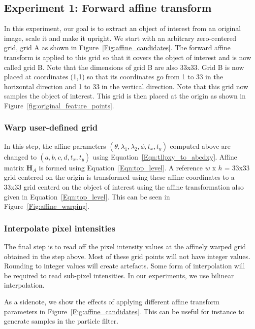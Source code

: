 \subsection{Experiment 1: Forward affine transform}
In this experiment, our goal is to extract an object of interest from an original image, scale it and make it upright.  We start with an arbitrary zero-centered grid, grid A as shown in Figure~\ref{Fig:affine_candidates}.  The forward affine transform is applied to this grid so that it covers the object of interest and is now called grid B.  Note that the dimensions of grid B are also 33x33.  Grid B is now placed at coordinates (1,1) so that its coordinates go from 1 to 33 in the horizontal direction and 1 to 33 in the vertical direction.  Note that this grid now samples the object of interest.  This grid is then placed at the origin as shown in Figure~\ref{fig:original_feature_points}.  

\subsubsection{Warp user-defined grid}
In this step, the affine parameters $(\theta, \lambda_1, \lambda_2, \phi, t_x, t_y)$ computed above are changed to $(a, b, c, d, t_x, t_y)$ using Equation~\ref{Eqn:tllpxy_to_abcdxy}.  Affine matrix $\mathbf{H}_A$ is formed using Equation~\ref{Eqn:top_level}.  A reference $w$ x $h$ = 33x33 grid centered on the origin is transformed using these affine coordinates to a 33x33 grid centerd on the object of interest using the affine transformation also given in Equation~\ref{Eqn:top_level}.  This can be seen in Figure~\ref{Fig:affine_warping}.

\subsubsection{Interpolate pixel intensities}
The final step is to read off the pixel intensity values at the affinely warped grid obtained in the step above.  Most of these grid points will not have integer values.  Rounding to integer values will create artefacts.  Some form of interpolation will be required to read sub-pixel intensities.  In our experiments, we use bilinear interpolation. 

As a sidenote, we show the effects of applying different affine transform parameters in Figure~\ref{Fig:affine_candidates}.  This can be useful for instance to generate samples in the particle filter.


